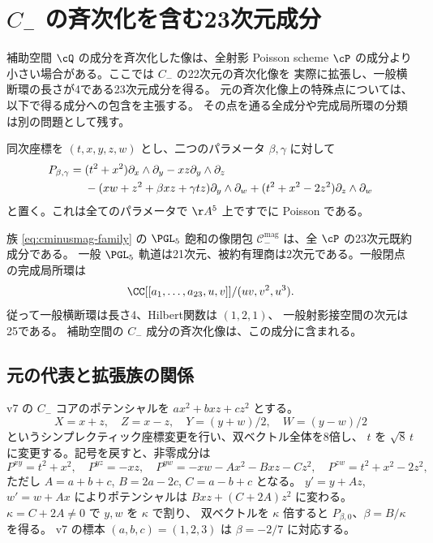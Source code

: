 \section{\texorpdfstring{$C_-$}{Cminus} の斉次化を含む23次元成分}
\label{sec:cminusmag}

補助空間 $\cQ$ の成分を斉次化した像は、全射影 Poisson scheme
$\cP$ の成分より小さい場合がある。ここでは $C_-$ の22次元の斉次化像を
実際に拡張し、一般横断環の長さが4である23次元成分を得る。
元の斉次化像上の特殊点については、以下で得る成分への包含を主張する。
その点を通る全成分や完成局所環の分類は別の問題として残す。

同次座標を $(t,x,y,z,w)$ とし、二つのパラメータ $\beta,\gamma$ に対して
\begin{align}
 P_{\beta,\gamma}={}&(t^2+x^2)\partial_x\wedge\partial_y
 -xz\partial_y\wedge\partial_z\notag\\
 &-(xw+z^2+\beta xz+\gamma tz)\partial_y\wedge\partial_w
 +(t^2+x^2-2z^2)\partial_z\wedge\partial_w
 \label{eq:cminusmag-family}
\end{align}
と置く。これは全てのパラメータで $\AA^5$ 上ですでに Poisson である。

\begin{theorem}\label{thm:cminusmag}
族 \eqref{eq:cminusmag-family} の $\PGL_5$ 飽和の像閉包
$\mathcal C_-^{\mathrm{mag}}$ は、全 $\cP$ の23次元既約成分である。
一般 $\PGL_5$ 軌道は21次元、被約有理商は2次元である。一般閉点の完成局所環は
\begin{equation}
 \CC[[a_1,\ldots,a_{23},u,v]]/(uv,v^2,u^3).
 \label{eq:cminusmag-ring}
\end{equation}
従って一般横断環は長さ4、Hilbert関数は $(1,2,1)$、
一般射影接空間の次元は25である。
補助空間の $C_-$ 成分の斉次化像は、この成分に含まれる。
\end{theorem}

\subsection{元の代表と拡張族の関係}

v7 の $C_-$ コアのポテンシャルを $ax^2+bxz+cz^2$ とする。
\[
 X=x+z,\quad Z=x-z,\quad Y=(y+w)/2,\quad W=(y-w)/2
\]
というシンプレクティック座標変更を行い、双ベクトル全体を8倍し、
$t$ を $\sqrt8\,t$ に変更する。記号を戻すと、非零成分は
\[
 P^{xy}=t^2+x^2,\quad P^{yz}=-xz,\quad
 P^{yw}=-xw-Ax^2-Bxz-Cz^2,\quad P^{zw}=t^2+x^2-2z^2,
\]
ただし $A=a+b+c$, $B=2a-2c$, $C=a-b+c$ となる。
$y'=y+Az$, $w'=w+Ax$ によりポテンシャルは
$Bxz+(C+2A)z^2$ に変わる。$\kappa=C+2A\ne0$ で $y,w$ を $\kappa$ で割り、
双ベクトルを $\kappa$ 倍すると $P_{\beta,0}$、$\beta=B/\kappa$ を得る。
v7 の標本 $(a,b,c)=(1,2,3)$ は $\beta=-2/7$ に対応する。

